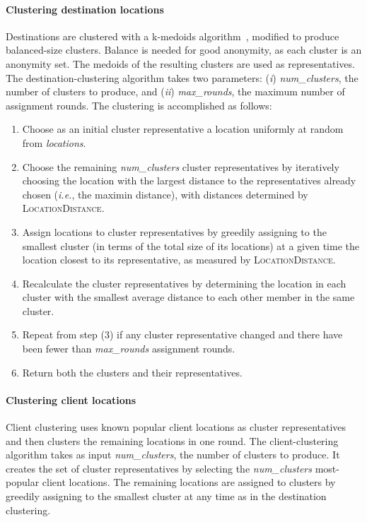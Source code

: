 \documentclass[conference]{styles/IEEEtran}
\newcommand{\ie}{\emph{i.e.}}
\newcommand{\compactify}{\settowidth{\labelsep}{o} \settowidth{\labelwidth}{o} \settowidth{\labelindent}{o}}
\begin{document}
\paragraph{Clustering destination locations}
Destinations are clustered with a k-medoids algorithm~\cite{park-medoid-voronoi-2009}, modified to
produce balanced-size clusters. Balance is needed for good anonymity, as each cluster is an
anonymity set. The medoids of the resulting clusters are used as representatives. 
The destination-clustering algorithm takes two parameters: (\emph{i}) \textit{num\_clusters},
the number of clusters to produce, and (\emph{ii}) \textit{max\_rounds}, the maximum number of
assignment rounds. The clustering is accomplished as follows:
\begin{enumerate}[\compactify]
	\item Choose as an initial cluster representative a location uniformly at random from
	\textit{locations}.

    \item Choose the remaining \textit{num\_clusters} cluster representatives by
    iteratively choosing the location with the largest distance to the representatives
    already chosen (\ie{}, the maximin distance), with distances determined by
    \textsc{LocationDistance}.


    \item Assign locations to cluster representatives by greedily assigning to the smallest
    cluster (in terms of the total size of its locations) at a given time the location closest to
    its representative, as measured by \textsc{LocationDistance}.


    \item Recalculate the cluster representatives by determining the location in
    each cluster with the smallest average distance to each other member in the
    same cluster.

    \item Repeat from step (3) if any cluster representative changed and there have been fewer than
    \textit{max\_rounds} assignment rounds.

    \item Return both the clusters and their representatives.
\end{enumerate}



\paragraph{Clustering client locations}
Client clustering uses known popular client locations as cluster representatives and
then clusters the remaining locations in one round. The client-clustering algorithm takes as input
\textit{num\_clusters}, the number of clusters to produce. It creates
the set of cluster representatives by selecting the \textit{num\_clusters} most-popular client
locations. The remaining locations are assigned to clusters by greedily assigning to the smallest
cluster at any time as in the destination clustering.
\end{document}
